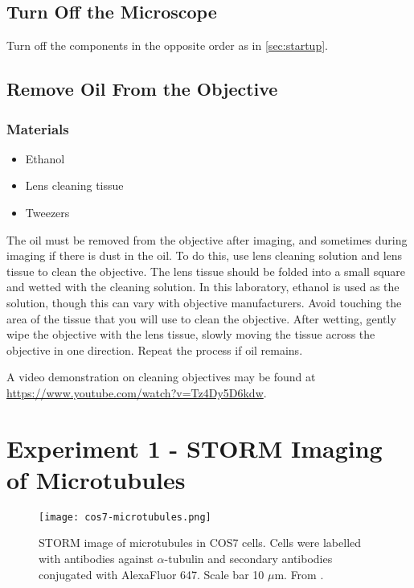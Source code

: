 \documentclass[10pt,a4paper,oneside]{book}
\begin{document}
\subsection{Turn Off the Microscope}

Turn off the components in the opposite order as in \autoref{sec:startup}.

\subsection{Remove Oil From the Objective}\label{sec:remove-oil}

\subsubsection{Materials}

\begin{itemize}
    \item{Ethanol}
    \item{Lens cleaning tissue}
    \item{Tweezers}
\end{itemize}

The oil must be removed from the objective after imaging, and sometimes during imaging if there is dust in the oil. To do this, use lens cleaning solution and lens tissue to clean the objective. The lens tissue should be folded into a small square and wetted with the cleaning solution. In this laboratory, ethanol is used as the solution, though this can vary with objective manufacturers. Avoid touching the area of the tissue that you will use to clean the objective. After wetting, gently wipe the objective with the lens tissue, slowly moving the tissue across the objective in one direction. Repeat the process if oil remains.

A video demonstration on cleaning objectives may be found at \url{https://www.youtube.com/watch?v=Tz4Dy5D6kdw}.

\section{Experiment 1 - STORM Imaging of Microtubules}\label{sec:exp1}

\begin{figure}[ht]
    \centering
    \texttt{[image: cos7-microtubules.png]}
    \caption{STORM image of microtubules in COS7 cells. Cells were labelled with antibodies against $\alpha$-tubulin and secondary antibodies conjugated with AlexaFluor 647. Scale bar 10 $\mu$m. From \cite{douglass-naturephotonics-2016}.}
    \label{fig:cos7-microtubules}
\end{figure}
\end{document}

